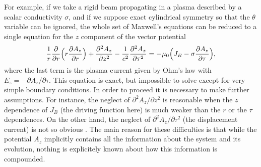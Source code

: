 \documentclass [12pt,a4paper,     ]{report} %
\begin{document}
  For example, if we take a rigid beam propagating in a plasma described by a scalar conductivity $\sigma$, and if we suppose exact cylindrical symmetry so that the $\theta$ variable can be ignored, the whole set of Maxwell's equations can be reduced to a single equation for the $z$ component of the vector potential \cite{MCART1973-}
%
\begin{equation}\label{pla:7} %
        \frac{1}{r} \frac{\partial      }{\partial r}
           \Bigl( r \frac{\partial   A_z}{\partial r} \Bigr)
     +              \frac{\partial^2 A_z}{\partial z^2}
     - \frac{1}{c^2}\frac{\partial^2 A_z}{\partial \tau^2}
     = - \mu_0 \Bigl( J_B - \sigma \frac{\partial A_z}{\partial \tau} \Bigr),
\end{equation}
%
where the last term is the plasma current given by Ohm's law with $E_z= -{\partial A_z}/{\partial \tau}$. This equation is exact, but impossible to solve except for very simple boundary conditions.  In order to proceed it is necessary to make further assumptions.  For instance, the neglect of ${\partial^2 A_z}/{\partial z^2}$ is reasonable when the $z$ dependence of $J_B$ (the driving function here) is much weaker than the $r$ or the $\tau$ dependences.  On the other hand, the neglect of ${\partial^2 A_z}/{\partial \tau^2}$ (the displacement current) is not so obvious \cite{MCART1973-}.  The main reason for these difficulties is that while the potential $A_z$ implicitly contains all the information about the system and its evolution, nothing is explicitely known about how this information is compounded.
\end{document}
